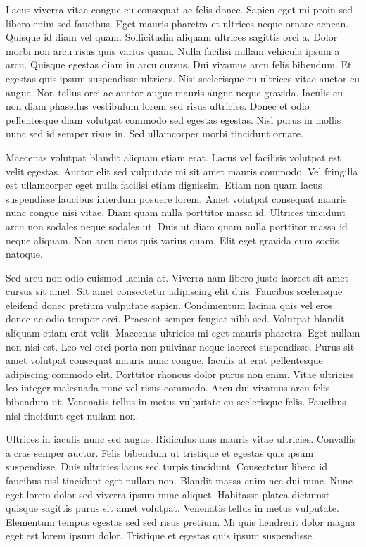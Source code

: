 \documentclass[11pt,a4paper]{article}
\begin{document}
Lacus viverra vitae congue eu consequat ac felis donec. Sapien eget mi proin sed libero enim sed faucibus. Eget mauris pharetra et ultrices neque ornare aenean. Quisque id diam vel quam. Sollicitudin aliquam ultrices sagittis orci a. Dolor morbi non arcu risus quis varius quam. Nulla facilisi nullam vehicula ipsum a arcu. Quisque egestas diam in arcu cursus. Dui vivamus arcu felis bibendum. Et egestas quis ipsum suspendisse ultrices. Nisi scelerisque eu ultrices vitae auctor eu augue. Non tellus orci ac auctor augue mauris augue neque gravida. Iaculis eu non diam phasellus vestibulum lorem sed risus ultricies. Donec et odio pellentesque diam volutpat commodo sed egestas egestas. Nisl purus in mollis nunc sed id semper risus in. Sed ullamcorper morbi tincidunt ornare.

Maecenas volutpat blandit aliquam etiam erat. Lacus vel facilisis volutpat est velit egestas. Auctor elit sed vulputate mi sit amet mauris commodo. Vel fringilla est ullamcorper eget nulla facilisi etiam dignissim. Etiam non quam lacus suspendisse faucibus interdum posuere lorem. Amet volutpat consequat mauris nunc congue nisi vitae. Diam quam nulla porttitor massa id. Ultrices tincidunt arcu non sodales neque sodales ut. Duis ut diam quam nulla porttitor massa id neque aliquam. Non arcu risus quis varius quam. Elit eget gravida cum sociis natoque.

Sed arcu non odio euismod lacinia at. Viverra nam libero justo laoreet sit amet cursus sit amet. Sit amet consectetur adipiscing elit duis. Faucibus scelerisque eleifend donec pretium vulputate sapien. Condimentum lacinia quis vel eros donec ac odio tempor orci. Praesent semper feugiat nibh sed. Volutpat blandit aliquam etiam erat velit. Maecenas ultricies mi eget mauris pharetra. Eget nullam non nisi est. Leo vel orci porta non pulvinar neque laoreet suspendisse. Purus sit amet volutpat consequat mauris nunc congue. Iaculis at erat pellentesque adipiscing commodo elit. Porttitor rhoncus dolor purus non enim. Vitae ultricies leo integer malesuada nunc vel risus commodo. Arcu dui vivamus arcu felis bibendum ut. Venenatis tellus in metus vulputate eu scelerisque felis. Faucibus nisl tincidunt eget nullam non.

Ultrices in iaculis nunc sed augue. Ridiculus mus mauris vitae ultricies. Convallis a cras semper auctor. Felis bibendum ut tristique et egestas quis ipsum suspendisse. Duis ultricies lacus sed turpis tincidunt. Consectetur libero id faucibus nisl tincidunt eget nullam non. Blandit massa enim nec dui nunc. Nunc eget lorem dolor sed viverra ipsum nunc aliquet. Habitasse platea dictumst quisque sagittis purus sit amet volutpat. Venenatis tellus in metus vulputate. Elementum tempus egestas sed sed risus pretium. Mi quis hendrerit dolor magna eget est lorem ipsum dolor. Tristique et egestas quis ipsum suspendisse.
\end{document}

